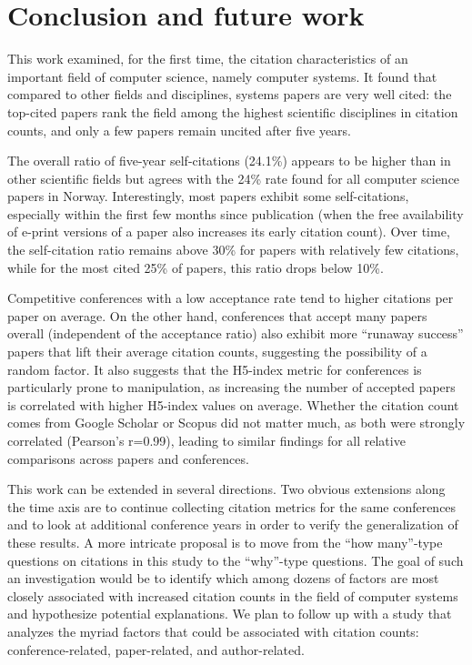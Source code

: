 \documentclass{article}
\begin{document}
\hypertarget{sec:conclusion}{%
\section{Conclusion and future work}\label{sec:conclusion}}

This work examined, for the first time, the citation characteristics of an important field of computer science, namely computer systems.
It found that compared to other fields and disciplines, systems papers are very well cited: the top-cited papers rank the field among the highest scientific disciplines in citation counts, and only a few papers remain uncited after five years.

The overall ratio of five-year self-citations (24.1\%) appears to be higher than in other scientific fields but agrees with the 24\% rate found for all computer science papers in Norway.
Interestingly, most papers exhibit some self-citations, especially within the first few months since publication (when the free availability of e-print versions of a paper also increases its early citation count).
Over time, the self-citation ratio remains above 30\% for papers with relatively few citations, while for the most cited 25\% of papers, this ratio drops below 10\%.

Competitive conferences with a low acceptance rate tend to higher citations per paper on average.
On the other hand, conferences that accept many papers overall (independent of the acceptance ratio) also exhibit more ``runaway success'' papers that lift their average citation counts, suggesting the possibility of a random factor.
It also suggests that the H5-index metric for conferences is particularly prone to manipulation, as increasing the number of accepted papers is correlated with higher H5-index values on average.
Whether the citation count comes from Google Scholar or Scopus did not matter much, as both were strongly correlated (Pearson's r=0.99), leading to similar findings for all relative comparisons across papers and conferences.

This work can be extended in several directions.
Two obvious extensions along the time axis are to continue collecting citation metrics for the same conferences and to look at additional conference years in order to verify the generalization of these results.
A more intricate proposal is to move from the ``how many''-type questions on citations in this study to the ``why''-type questions.
The goal of such an investigation would be to identify which among dozens of factors are most closely associated with increased citation counts in the field of computer systems and hypothesize potential explanations.
We plan to follow up with a study that analyzes the myriad factors that could be associated with citation counts: conference-related, paper-related, and author-related.
\end{document}
